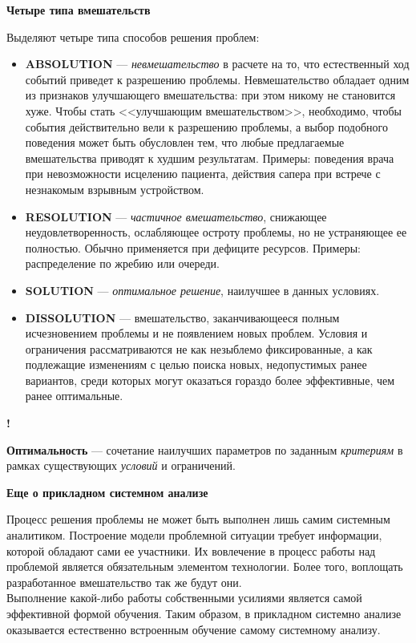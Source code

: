 \documentclass{article}
\newcommand{\note}[1]{\textit{#1}}
\newcommand{\important}[1]{\textbf{#1}}
\renewcommand{\subsection}[1]{
	\vspace{2em}
	\begin{flushright}
		\large
		\textbf{#1}
	\end{flushright}
	}
\newcommand{\define}[2]{
	\textbf{#1} --- #2
	}
\newcommand{\marked}[2]{
	\begin{flushright}\textbf{!}\hspace{2ex}\vline\hspace{2ex}
		\begin{minipage}{0.9\textwidth}
			\define{#1}{#2}
		\end{minipage}
	\end{flushright}
	}
\begin{document}
\subsection{Четыре типа вмешательств}
Выделяют четыре типа способов решения проблем:
\begin{itemize}
	\item \important{ABSOLUTION} --- \note{невмешательство} в расчете на то, что естественный ход событий приведет к разрешению проблемы. Невмешательство обладает одним из признаков улучшающего вмешательства: при этом никому не становится хуже. Чтобы стать <<улучшающим вмешательством>>, необходимо, чтобы события действительно вели к разрешению проблемы, а выбор подобного поведения может быть обусловлен тем, что любые предлагаемые вмешательства приводят к худшим результатам. Примеры: поведения врача при невозможности исцелению пациента, действия сапера при встрече с незнакомым взрывным устройством.
	\item \important{RESOLUTION} --- \note{частичное вмешательство}, снижающее неудовлетворенность, ослабляющее остроту проблемы, но не устраняющее ее полностью. Обычно применяется при дефиците ресурсов. Примеры: распределение по жребию или очереди.
	\item \important{SOLUTION} --- \note{оптимальное решение}, наилучшее в данных условиях. 
	\item \important{DISSOLUTION} --- вмешательство, заканчивающееся полным исчезновением проблемы и не появлением новых проблем. Условия и ограничения рассматриваются не как незыблемо фиксированные, а как подлежащие изменениям с целью поиска новых, недопустимых ранее вариантов, среди которых могут оказаться гораздо более эффективные, чем ранее оптимальные.	
\end{itemize}
\marked{Оптимальность}{сочетание наилучших параметров по заданным \note{критериям} в рамках существующих \note{условий} и ограничений.}
\subsection{Еще о прикладном системном анализе}
Процесс решения проблемы не может быть выполнен лишь самим системным аналитиком. Построение модели проблемной ситуации требует информации, которой обладают сами ее участники. Их вовлечение в процесс работы над проблемой является обязательным элементом технологии. Более того, воплощать разработанное вмешательство так же будут они.\\
Выполнение какой-либо работы собственными усилиями является самой эффективной формой обучения. Таким образом, в прикладном системно анализе оказывается естественно встроенным обучение самому системному анализу.
\end{document}
